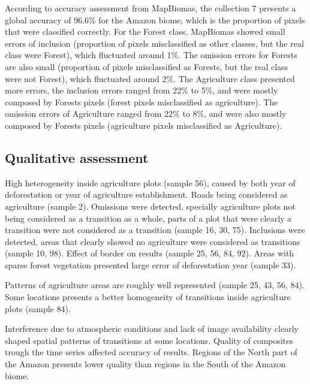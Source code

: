 \documentclass[essd, manuscript]{copernicus}
\begin{document}
According to accuracy assessment from MapBiomas, the collection 7 presents a global accuracy of 96.6\% for the Amazon biome, which is the proportion of pixels that were classified correctly.
For the Forest class, MapBiomas showed small errors of inclusion (proportion of pixels misclassified as other classes, but the real class were Forest), which fluctuated around 1\%.
The omission errors for Forests are also small (proportion of pixels misclassified as Forests, but the real class were not Forest), which fluctuated around 2\%.
The Agriculture class presented more errors, the inclusion errors ranged from 22\% to 5\%, and were mostly composed by Forests pixels (forest pixels misclassified as agriculture).
The omission errors of Agriculture ranged from 22\% to 8\%, and were also mostly composed by Forests pixels (agriculture pixels misclassified as Agriculture).

\subsection{Qualitative assessment}

High heterogeneity inside agriculture plots (sample 56), caused by both year of deforestation or year of agriculture establishment.
Roads being considered as agriculture (sample 2).
Omissions were detected, specially agriculture plots not being considered as a transition as a whole, parts of a plot that were clearly a transition were not considered as a transition (sample 16, 30, 75).
Inclusions were detected, areas that clearly showed no agriculture were considered as transitions (sample 10, 98).
Effect of border on results (sample 25, 56, 84, 92).
Areas with sparse forest vegetation presented large error of deforestation year (sample 33).

Patterns of agriculture areas are roughly well represented (sample 25, 43, 56, 84).
Some locations presents a better homogeneity of transitions inside agriculture plots (sample 84).

Interference due to atmospheric conditions and lack of image availability clearly shaped spatial patterns of transitions at some locations.
Quality of composites trough the time series affected accuracy of results.
Regions of the North part of the Amazon presents lower quality than regions in the South of the Amazon biome.

\conclusions[Conclusions]






\end{document}
